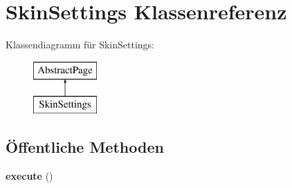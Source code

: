 \hypertarget{class_skin_settings}{}\section{Skin\+Settings Klassenreferenz}
\label{class_skin_settings}
Klassendiagramm für Skin\+Settings\+:\begin{figure}[H]
\begin{center}
\leavevmode
\includegraphics[height=2.000000cm]{class_skin_settings}
\end{center}
\end{figure}
\subsection*{Öffentliche Methoden}
\begin{DoxyCompactItemize}
\item 
\mbox{\label{class_skin_settings_a9d1eea634094a1c5216adc42b154e31e}} 
{\bfseries execute} ()
\end{DoxyCompactItemize}
